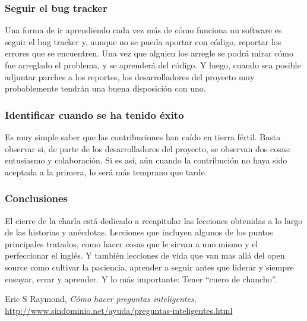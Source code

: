 \subsubsection*{Seguir el bug tracker}

Una forma de ir aprendiendo cada vez más de cómo funciona un software es seguir
el bug tracker y, aunque no se pueda aportar con código, reportar los errores
que se encuentren. Una vez que alguien los arregle se podrá mirar cómo fue
arreglado el problema, y se aprenderá del código. Y luego, cuando sea posible
adjuntar parches a los reportes, los desarrolladores del proyecto muy
probablemente tendrán una buena disposición con uno.

\subsubsection*{Identificar cuando se ha tenido éxito}

Es muy simple saber que las contribuciones han caído en tierra fértil. Basta
observar si, de parte de los desarrolladores del proyecto, se observan dos
cosas: entusiasmo y colaboración. Si es así, aún cuando la contribución no haya
sido aceptada a la primera, lo será más temprano que tarde.

\subsubsection*{Conclusiones}

El cierre de la charla está dedicado a recapitular las lecciones obtenidas a lo
largo de las historias y anécdotas. Lecciones que incluyen algunos de los puntos
principales tratados, como hacer cosas que le sirvan a uno mismo y el
perfeccionar el inglés. Y también lecciones de vida que van mas allá del open
source como cultivar la paciencia, aprender a seguir antes que liderar y siempre
ensayar, errar y aprender. Y lo más importante: Tener ``cuero de chancho''.

\begin{thebibliography}{}

  Eric S Raymond,  \textit{Cómo hacer preguntas inteligentes}, \url{http://www.sindominio.net/ayuda/preguntas-inteligentes.html}
\end{thebibliography}

\newpage

